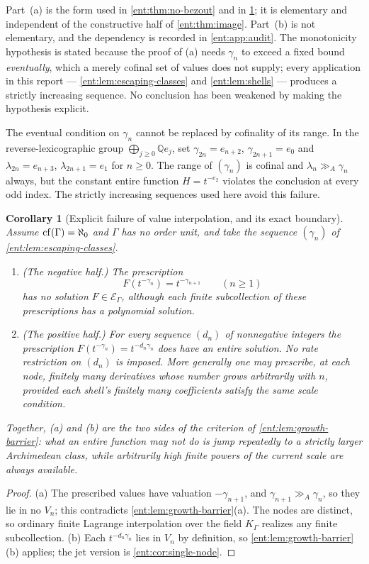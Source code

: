 \documentclass[11pt]{article}
\theoremstyle{plain}
\theoremstyle{plain}
\theoremstyle{plain}
\newtheorem{corollary}[corollary]{Corollary}
\theoremstyle{definition}
\theoremstyle{definition}
\theoremstyle{definition}
\theoremstyle{definition}
\theoremstyle{remark}
\newcommand{\Q}{\mathbb Q}\newcommand{\Z}{\mathbb Z}\newcommand{\N}{\mathbb N}
\newcommand{\K}{K_\Gamma}\newcommand{\KD}{K_\Delta}
\newcommand{\E}{\mathcal E_\Gamma}
\newcommand{\ggA}{\mathrel{\gg_{\!A}}}
\begin{document}
Part~(a) is the form used in \cref{ent:thm:no-bezout} and in
\cref{ent:cor:no-interpolation}; it is elementary and independent of the
constructive half of \cref{ent:thm:image}. Part~(b) is not elementary, and
the dependency is recorded in \cref{ent:app:audit}. The monotonicity
hypothesis is stated because the proof of (a) needs $\gamma_n$ to exceed a
fixed bound \emph{eventually}, which a merely cofinal set of values does not
supply; every application in this report --- \cref{ent:lem:escaping-classes}
and \cref{ent:lem:shells} --- produces a strictly increasing sequence. No
conclusion has been weakened by making the hypothesis explicit.

The eventual condition on $\gamma_n$ cannot be replaced by cofinality of
its range. In the reverse-lexicographic group
$\bigoplus_{j\ge0}\Q e_j$, set
$\gamma_{2n}=e_{n+2}$, $\gamma_{2n+1}=e_0$ and
$\lambda_{2n}=e_{n+3}$, $\lambda_{2n+1}=e_1$ for $n\ge0$.
The range of $(\gamma_n)$ is cofinal and $\lambda_n\ggA\gamma_n$ always,
but the constant entire function $H=t^{-e_2}$ violates the conclusion at
every odd index. The strictly increasing sequences used here avoid this failure.


\begin{corollary}[Explicit failure of value interpolation, and its exact
boundary]
\label{ent:cor:no-interpolation}
Assume $\operatorname{cf}(\Gamma)=\aleph_0$ and $\Gamma$ has no order unit, and take the
sequence $(\gamma_n)$ of \cref{ent:lem:escaping-classes}.
\begin{enumerate}[label=\textnormal{(\alph*)},leftmargin=2em]
\item \emph{(The negative half.)} The prescription
\[
 F(t^{-\gamma_n})=t^{-\gamma_{n+1}}\qquad(n\ge1)
\]
has no solution $F\in\E$, although each finite subcollection of these
prescriptions has a polynomial solution.
\item \emph{(The positive half.)} For \emph{every} sequence $(d_n)$ of
nonnegative integers the prescription $F(t^{-\gamma_n})=t^{-d_n\gamma_n}$
does have an entire solution. No rate restriction on $(d_n)$ is imposed. More
generally one may prescribe, at each node, finitely many derivatives whose
number grows arbitrarily with $n$, provided each shell's finitely many
coefficients satisfy the same scale condition.
\end{enumerate}
Together, (a) and (b) are the two sides of the criterion of
\cref{ent:lem:growth-barrier}: what an entire function may not do is jump
repeatedly to a strictly larger Archimedean class, while arbitrarily high
\emph{finite} powers of the current scale are always available.
\end{corollary}
\begin{proof}
(a) The prescribed values have valuation $-\gamma_{n+1}$, and
$\gamma_{n+1}\ggA\gamma_n$, so they lie in no $V_n$; this contradicts
\cref{ent:lem:growth-barrier}(a). The nodes are distinct, so ordinary finite
Lagrange interpolation over the field $\K$ realizes any finite subcollection.
(b) Each $t^{-d_n\gamma_n}$ lies in $V_n$ by definition, so
\cref{ent:lem:growth-barrier}(b) applies; the jet version is
\cref{ent:cor:single-node}.
\end{proof}
\end{document}
